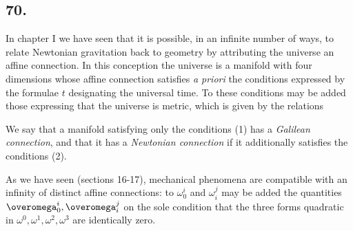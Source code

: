 \subsection*{70.}

\nc{\overomega}{\overline{\omega}}

In chapter I we have seen that it is possible, in an infinite number of ways, to relate Newtonian gravitation back to geometry by attributing the universe an affine connection. In this conception the universe is a manifold with four dimensions whose affine connection satisfies \textit{a priori} the conditions expressed by the formulae
$t$ designating the universal time. To these conditions may be added those expressing that the universe is metric, which is given by the relations

We say that a manifold satisfying only the conditions (1) has a \textit{Galilean connection}, and that it has a \textit{Newtonian connection} if it additionally satisfies the conditions (2).

As we have seen (sections 16-17), mechanical phenomena are compatible with an infinity of distinct affine connections: to $\omega_0^i$ and $\omega_i^j$ may be added the quantities $\overomega_0^i, \overomega_i^j$ on the sole condition that the three forms quadratic in $\omega^0, \omega^1, \omega^2, \omega^3$
are identically zero.